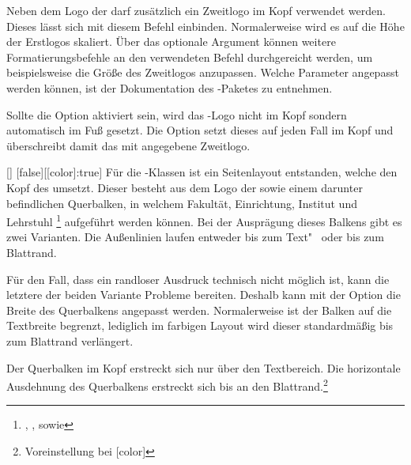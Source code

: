 \begin{Declaration}{%
  \LParameter{}%
}
\printdeclarationlist%
%
%
Neben dem Logo der \TnUD darf zusätzlich ein Zweitlogo im Kopf verwendet werden.
Dieses lässt sich mit diesem Befehl einbinden. Normalerweise wird es auf die 
Höhe der Erstlogos skaliert. Über das optionale Argument können weitere 
Formatierungsbefehle an den verwendeten Befehl  
durchgereicht werden, um beispielsweise die Größe des Zweitlogos anzupassen.
Welche Parameter angepasst werden können, ist der Dokumentation des
-Paketes zu entnehmen.

Sollte die Option  aktiviert sein, wird das \DDC-Logo nicht im Kopf 
sondern automatisch im Fuß gesetzt. Die Option  setzt dieses 
auf jeden Fall im Kopf und überschreibt damit das mit  
angegebene Zweitlogo.
\end{Declaration}

\begin{Declaration}{[\PBoolean]}%
  [false][[color]:true]%
\printdeclarationlist%
%
%
Für die \TUDScript-Klassen ist ein Seitenlayout entstanden, welche den Kopf des
\CDs umsetzt. Dieser besteht aus dem Logo der \TnUD sowie einem darunter 
befindlichen Querbalken, in welchem Fakultät, Einrichtung, Institut und 
Lehrstuhl%
\footnote{%
  , ,  sowie %
}
aufgeführt werden können. Bei der Ausprägung dieses Balkens gibt es zwei 
Varianten. Die Außenlinien laufen entweder bis zum Text"~ oder bis zum 
Blattrand.

Für den Fall, dass ein randloser Ausdruck technisch nicht möglich ist, 
kann die letztere der beiden Variante Probleme bereiten. Deshalb kann mit der 
Option  die Breite des Querbalkens angepasst werden. 
Normalerweise ist der Balken auf die Textbreite begrenzt, lediglich im farbigen 
Layout wird dieser standardmäßig bis zum Blattrand verlängert.
%
\begin{values}
\itemfalse
  Der Querbalken im Kopf erstreckt sich nur über den Textbereich.
\itemtrue*
  Die horizontale Ausdehnung des Querbalkens erstreckt sich bis an den 
  Blattrand.\footnote{Voreinstellung bei [color]} 
\end{values}
\end{Declaration}


